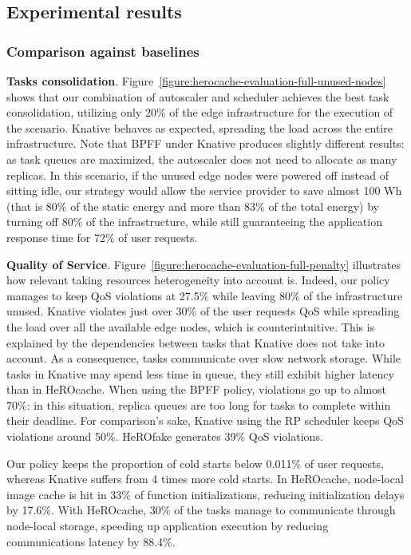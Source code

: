 \subsection{Experimental results}

\subsubsection{Comparison against baselines}

\textbf{Tasks consolidation}. Figure~\ref{figure:herocache-evaluation-full-unused-nodes} shows that our combination of autoscaler and scheduler achieves the best task consolidation, utilizing only 20\% of the edge infrastructure for the execution of the scenario. Knative behaves as expected, spreading the load across the entire infrastructure. Note that BPFF under Knative produces slightly different results: as task queues are maximized, the autoscaler does not need to allocate as many replicas. In this scenario, if the unused edge nodes were powered off instead of sitting idle, our strategy would allow the service provider to save almost 100 Wh (that is 80\% of the static energy and more than 83\% of the total energy) by turning off 80\% of the infrastructure, while still guaranteeing the application response time for 72\% of user requests.

\textbf{Quality of Service}. Figure~\ref{figure:herocache-evaluation-full-penalty} illustrates how relevant taking resources heterogeneity into account is. Indeed, our policy manages to keep QoS violations at 27.5\% while leaving 80\% of the infrastructure unused. Knative violates just over 30\% of the user requests QoS while spreading the load over all the available edge nodes, which is counterintuitive. This is explained by the dependencies between tasks that Knative does not take into account. As a consequence, tasks communicate over slow network storage. While tasks in Knative may spend less time in queue, they still exhibit higher latency than in HeROcache. When using the BPFF policy, violations go up to almost 70\%: in this situation, replica queues are too long for tasks to complete within their deadline. For comparison's sake, Knative using the RP scheduler keeps QoS violations around 50\%. HeROfake generates 39\% QoS violations.

Our policy keeps the proportion of cold starts below 0.011\% of user requests, whereas Knative suffers from 4 times more cold starts. In HeROcache, node-local image cache is hit in 33\% of function initializations, reducing initialization delays by 17.6\%.
With HeROcache, 30\% of the tasks manage to communicate through node-local storage, speeding up application execution by reducing communications latency by 88.4\%.

